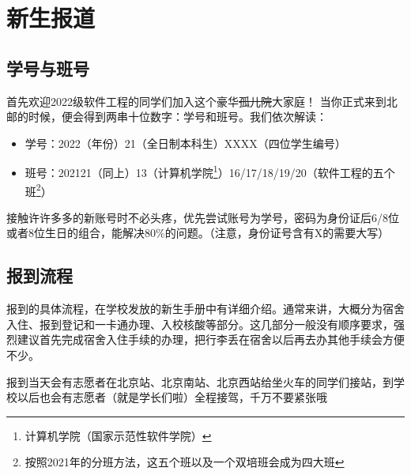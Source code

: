 \section{新生报道}

\subsection*{学号与班号}

首先欢迎2022级软件工程的同学们加入这个豪华\sout{孤儿院}大家庭！
当你正式来到北邮的时候，便会得到两串十位数字：学号和班号。我们依次解读：
\begin{itemize}
    \kaishu
    \item 学号：2022（年份）21（全日制本科生）XXXX（四位学生编号）
    \item 班号：202121（同上）13（计算机学院\footnote{计算机学院（国家示范性软件学院）}）16/17/18/19/20（软件工程的五个班\footnote{按照2021年的分班方法，这五个班以及一个双培班会成为四大班}）
\end{itemize}

接触许许多多的新账号时不必头疼，优先尝试账号为学号，密码为身份证后6/8位或者8位生日的组合，能解决80\%的问题。（注意，身份证号含有X的需要大写）

\subsection*{报到流程}


报到的具体流程，在学校发放的新生手册中有详细介绍。通常来讲，大概分为宿舍入住、报到登记和一卡通办理、入校核酸等部分。这几部分一般没有顺序要求，强烈建议首先完成宿舍入住手续的办理，把行李丢在宿舍以后再去办其他手续会方便不少。

报到当天会有志愿者在北京站、北京南站、北京西站给坐火车的同学们接站，到学校以后也会有志愿者（就是学长们啦）全程接驾，千万不要紧张哦~
